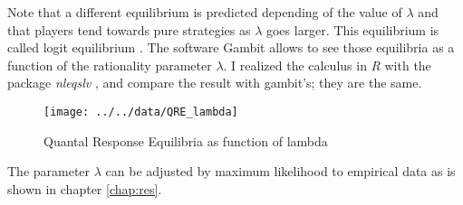 
Note that a different equilibrium is predicted depending of the value of $\lambda$ and that players tend towards pure strategies as $\lambda$ goes larger. This equilibrium is called logit equilibrium \cite{Goeree2016}. The software Gambit \cite{McKelvey2014} allows to see those equilibria as a function of the rationality parameter $\lambda$. I realized the calculus in \emph{R} \cite{Rpackage} with the package \emph{nleqslv} \cite{Hasselman2011}, and compare the result with gambit's; they are the same. 



\begin{figure}
\centering
\texttt{[image: ../../data/QRE\_lambda]}
\caption[QRE]{Quantal Response Equilibria as function of lambda}
\label{fig:qrelambda}
\end{figure}


The parameter $\lambda$ can be adjusted by maximum likelihood to empirical data as is shown in chapter \ref{chap:res}.



